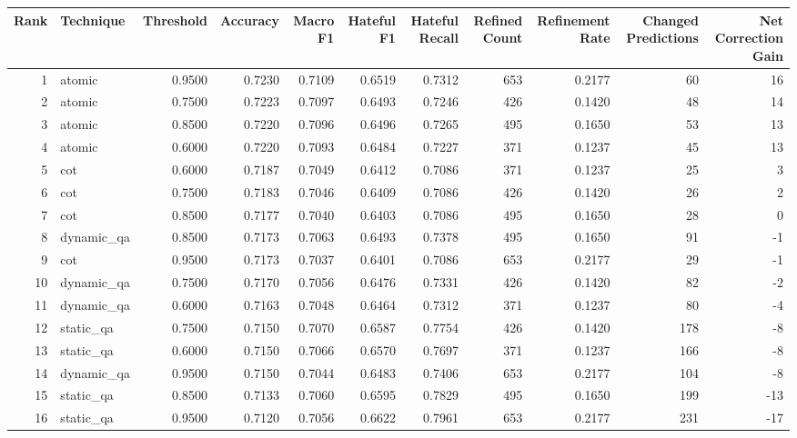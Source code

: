 \begin{tabular}{rlrrrrrrrrr}
\toprule
Rank & Technique & Threshold & Accuracy & Macro F1 & Hateful F1 & Hateful Recall & Refined Count & Refinement Rate & Changed Predictions & Net Correction Gain \\
\midrule
1 & atomic & 0.9500 & 0.7230 & 0.7109 & 0.6519 & 0.7312 & 653 & 0.2177 & 60 & 16 \\
2 & atomic & 0.7500 & 0.7223 & 0.7097 & 0.6493 & 0.7246 & 426 & 0.1420 & 48 & 14 \\
3 & atomic & 0.8500 & 0.7220 & 0.7096 & 0.6496 & 0.7265 & 495 & 0.1650 & 53 & 13 \\
4 & atomic & 0.6000 & 0.7220 & 0.7093 & 0.6484 & 0.7227 & 371 & 0.1237 & 45 & 13 \\
5 & cot & 0.6000 & 0.7187 & 0.7049 & 0.6412 & 0.7086 & 371 & 0.1237 & 25 & 3 \\
6 & cot & 0.7500 & 0.7183 & 0.7046 & 0.6409 & 0.7086 & 426 & 0.1420 & 26 & 2 \\
7 & cot & 0.8500 & 0.7177 & 0.7040 & 0.6403 & 0.7086 & 495 & 0.1650 & 28 & 0 \\
8 & dynamic_qa & 0.8500 & 0.7173 & 0.7063 & 0.6493 & 0.7378 & 495 & 0.1650 & 91 & -1 \\
9 & cot & 0.9500 & 0.7173 & 0.7037 & 0.6401 & 0.7086 & 653 & 0.2177 & 29 & -1 \\
10 & dynamic_qa & 0.7500 & 0.7170 & 0.7056 & 0.6476 & 0.7331 & 426 & 0.1420 & 82 & -2 \\
11 & dynamic_qa & 0.6000 & 0.7163 & 0.7048 & 0.6464 & 0.7312 & 371 & 0.1237 & 80 & -4 \\
12 & static_qa & 0.7500 & 0.7150 & 0.7070 & 0.6587 & 0.7754 & 426 & 0.1420 & 178 & -8 \\
13 & static_qa & 0.6000 & 0.7150 & 0.7066 & 0.6570 & 0.7697 & 371 & 0.1237 & 166 & -8 \\
14 & dynamic_qa & 0.9500 & 0.7150 & 0.7044 & 0.6483 & 0.7406 & 653 & 0.2177 & 104 & -8 \\
15 & static_qa & 0.8500 & 0.7133 & 0.7060 & 0.6595 & 0.7829 & 495 & 0.1650 & 199 & -13 \\
16 & static_qa & 0.9500 & 0.7120 & 0.7056 & 0.6622 & 0.7961 & 653 & 0.2177 & 231 & -17 \\
\bottomrule
\end{tabular}
